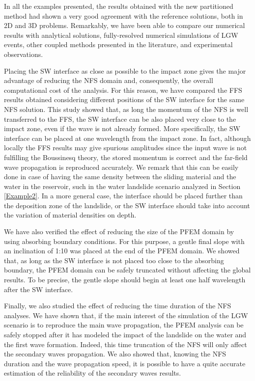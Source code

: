 In all the examples presented, the results obtained with the new partitioned method had shown a very good agreement with the reference solutions, both in 2D and 3D problems. Remarkably, we have been able to compare our numerical results with analytical solutions, fully-resolved numerical simulations of LGW events, other coupled methods presented in the literature, and experimental observations. 

Placing the SW interface as close as possible to the impact zone gives the major advantage of reducing the NFS domain and, consequently, the overall computational cost of the analysis. For this reason, we have compared the FFS results obtained considering different positions of the SW interface for the same NFS solution. This study showed that, as long the momentum of the NFS is well transferred to the FFS, the SW interface can be also placed very close to the impact zone, even if the wave is not already formed.
More specifically, the SW interface can be placed at one wavelength from the impact zone.
In fact, although locally the FFS results may give spurious amplitudes since the input wave is not fulfilling the Boussinesq theory, the stored momentum is correct and the far-field wave propagation is reproduced accurately. We remark that this can be easily done in case of having the same density between the sliding material and the water in the reservoir, such in the water landslide scenario analyzed in Section \ref{Example2}. In a more general case, the interface should be placed further than the deposition zone of the landslide, or the SW interface should take into account the variation of material densities on depth.

We have also verified the effect of reducing the size of the PFEM domain by using absorbing boundary conditions. For this purpose, a gentle final slope with an inclination of 1:10 was placed at the end of the PFEM domain. We showed that, as long as the SW interface is not placed too close to the absorbing boundary, the PFEM domain can be safely truncated without affecting the global results.
To be precise, the gentle slope should begin at least one half wavelength after the SW interface.


Finally, we also studied the effect of reducing the time duration of the NFS analyses. We have shown that, if the main interest of the simulation of the LGW scenario is to reproduce the main wave propagation, the PFEM analysis can be safely stopped after it has modeled the impact of the landslide on the water and the first wave formation. Indeed, this time truncation of the NFS will only affect the secondary waves propagation. We also showed that, knowing the NFS duration and the wave propagation speed, it is possible to have a quite accurate estimation of the reliability of the secondary waves results. 
 
